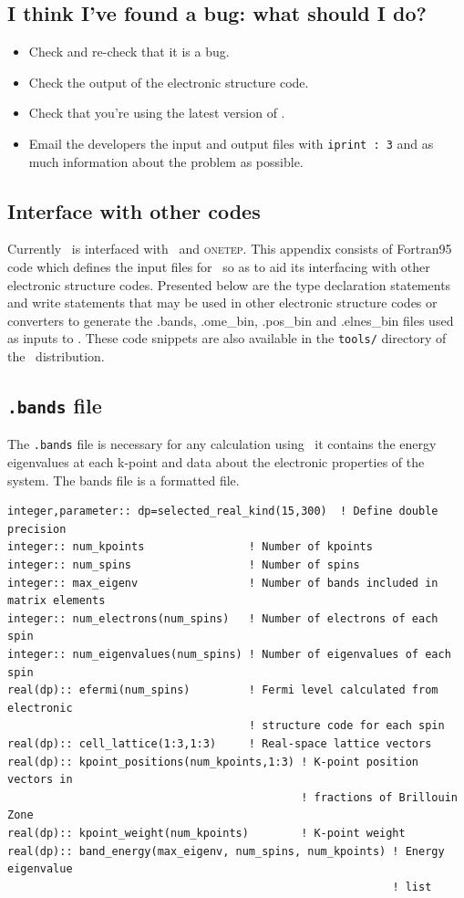 \documentclass[a4paper,11pt,twoside]{book}
\begin{document}
{\section{I think I've found a bug: what should I do?}
\begin{itemize}
\item Check and re-check that it is a bug.  
\item Check the output of the electronic structure code.
\item Check that you're using the latest version of \optados.
\item Email the developers the input and output files with
  \verb#iprint : 3# and as much information about the problem as possible.
\end{itemize}



\begin{appendix}

\chapter{Interface with other codes}
Currently \optados\ is interfaced with \castep\ and \textsc{onetep}.
%
This appendix consists of Fortran95 code which defines the input files for \optados\ so as to aid its interfacing with other electronic structure codes.
%
Presented below are the type declaration statements and write statements that may be used in other electronic structure codes or converters to generate the .bands, .ome\_bin, .pos\_bin and .elnes\_bin files used as inputs to \optados.
%
These code snippets are also available in the \texttt{tools/} directory of the \optados\ distribution.

\section{\texttt{.bands} file}
The \texttt{.bands} file is necessary for any calculation using \optados\ it contains the energy eigenvalues at each k-point and data about the electronic properties of the system.
%
The bands file is a formatted file.
\begin{verbatim}
integer,parameter:: dp=selected_real_kind(15,300)  ! Define double precision
integer:: num_kpoints                ! Number of kpoints
integer:: num_spins                  ! Number of spins
integer:: max_eigenv                 ! Number of bands included in matrix elements
integer:: num_electrons(num_spins)   ! Number of electrons of each spin
integer:: num_eigenvalues(num_spins) ! Number of eigenvalues of each spin
real(dp):: efermi(num_spins)         ! Fermi level calculated from electronic 
                                     ! structure code for each spin           
real(dp):: cell_lattice(1:3,1:3)     ! Real-space lattice vectors
real(dp):: kpoint_positions(num_kpoints,1:3) ! K-point position vectors in 
                                             ! fractions of Brillouin Zone
real(dp):: kpoint_weight(num_kpoints)        ! K-point weight
real(dp):: band_energy(max_eigenv, num_spins, num_kpoints) ! Energy eigenvalue 
                                                           ! list
                                          

\end{verbatim}
\end{appendix}}
\end{document}
